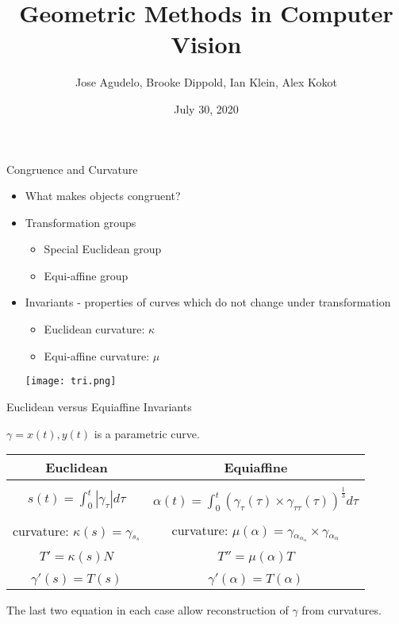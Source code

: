 \documentclass[]{beamer}
\title{Geometric Methods in Computer Vision}
\author{Jose Agudelo, Brooke Dippold, Ian Klein, Alex Kokot}
\institute{
Mentors: Eric Geiger and Irina Kogan
}
\date{July 30, 2020}
\begin{document}
\frame{\titlepage}

\begin{frame}{Congruence and Curvature}
\begin{itemize}
    \item What makes objects congruent?
    \item Transformation groups
    \begin{itemize}
        \item Special Euclidean group
        \item Equi-affine group
    \end{itemize}
    \item Invariants - properties of curves which do not change under transformation
    \begin{itemize}
        \item Euclidean curvature: $\kappa$
        \item Equi-affine curvature: $\mu$
    \end{itemize}
\begin{center}
\texttt{[image: tri.png]}
\end{center}
\end{itemize}
    
\end{frame}

\begin{frame}{Euclidean versus Equiaffine Invariants}

$\gamma = x(t), y(t)$ is a parametric curve.  
\vspace{0.5cm}
\begin{center}
\begin{tabular}[h]{|c|c|}
\hline 
    Euclidean & Equiaffine \\
    \hline 
       & \\
    $s(t) = \int_{0}^{t} |\gamma_{\tau} | d\tau $ & $\alpha(t) = \int_{0}^{t} (\gamma_\tau (\tau) \times \gamma_{\tau\tau}(\tau))^{\frac{1}{3}} d\tau$ \\
       & \\
   curvature:  $\kappa(s) = \gamma{_s_s}$ &curvature: $\mu(\alpha) = \gamma {_\alpha _\alpha _ \alpha} \times \gamma {_\alpha_\alpha} $\\
       & \\
    $T' = \kappa(s) N$ & $T'' = \mu(\alpha) T$\\ 
       & \\
    $\gamma'(s) = T(s)$ & $\gamma'(\alpha) = T(\alpha)$\\
\hline 
\end{tabular}
\end{center}
The last two equation in each case allow reconstruction of $\gamma$ from curvatures. 
\end{frame}
\end{document}
